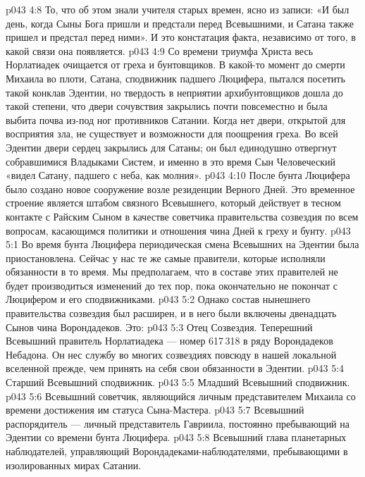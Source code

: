 \vs p043 4:8 То, что об этом знали учителя старых времен, ясно из записи: «И был день, когда Сыны Бога пришли и предстали перед Всевышними, и Сатана также пришел и предстал перед ними». И это констатация факта, независимо от того, в какой связи она появляется.
\vs p043 4:9 \pc Со времени триумфа Христа весь Норлатиадек очищается от греха и бунтовщиков. В какой\hyp{}то момент до смерти Михаила во плоти, Сатана, сподвижник падшего Люцифера, пытался посетить такой конклав Эдентии, но твердость в неприятии архибунтовщиков дошла до такой степени, что двери сочувствия закрылись почти повсеместно и была выбита почва из\hyp{}под ног противников Сатании. Когда нет двери, открытой для восприятия зла, не существует и возможности для поощрения греха. Во всей Эдентии двери сердец закрылись для Сатаны; он был единодушно отвергнут собравшимися Владыками Систем, и именно в это время Сын Человеческий «видел Сатану, падшего с неба, как молния».
\vs p043 4:10 После бунта Люцифера было создано новое сооружение возле резиденции Верного Дней. Это временное строение является штабом связного Всевышнего, который действует в тесном контакте с Райским Сыном в качестве советчика правительства созвездия по всем вопросам, касающимся политики и отношения чина Дней к греху и бунту.
\vs p043 5:1 Во время бунта Люцифера периодическая смена Всевышних на Эдентии была приостановлена. Сейчас у нас те же самые правители, которые исполняли обязанности в то время. Мы предполагаем, что в составе этих правителей не будет производиться изменений до тех пор, пока окончательно не покончат с Люцифером и его сподвижниками.
\vs p043 5:2 Однако состав нынешнего правительства созвездия был расширен, и в него были включены двенадцать Сынов чина Ворондадеков. Это:
\vs p043 5:3 \bibnobreakspace Отец Созвездия. Теперешний Всевышний правитель Норлатиадека --- номер 617\,318 в ряду Ворондадеков Небадона. Он нес службу во многих созвездиях повсюду в нашей локальной вселенной прежде, чем принять на себя свои обязанности в Эдентии.
\vs p043 5:4 \pc {}\bibnobreakspace Старший Всевышний сподвижник.
\vs p043 5:5 \pc {}\bibnobreakspace Младший Всевышний сподвижник.
\vs p043 5:6 \pc {}\bibnobreakspace Всевышний советчик, являющийся личным представителем Михаила со времени достижения им статуса Сына\hyp{}Мастера.
\vs p043 5:7 \pc {}\bibnobreakspace Всевышний распорядитель --- личный представитель Гавриила, постоянно пребывающий на Эдентии со времени бунта Люцифера.
\vs p043 5:8 \pc {}\bibnobreakspace Всевышний глава планетарных наблюдателей, управляющий Ворондадеками\hyp{}наблюдателями, пребывающими в изолированных мирах Сатании.
